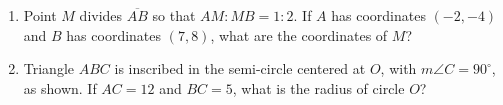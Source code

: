 \documentclass[12pt, oneside]{article}
\begin{document}
\begin{enumerate}
\newpage
 \item Point $M$ divides $\overline{AB}$ so that $AM{:}MB = 1{:}2$. If $A$ has coordinates $(-2,-4)$ and $B$ has coordinates $(7,8)$, what are the coordinates of $M$? \vspace{6cm}

 \item Triangle $ABC$ is inscribed in the semi-circle centered at $O$, with $m\angle C=90^\circ$, as shown. If $AC=12$ and $BC=5$, what is the radius of circle $O$? \vspace{0.5cm}
   \begin{center}
  \end{center}\vspace{5cm}

\end{enumerate}
\end{document}
